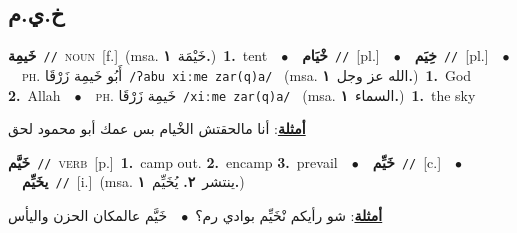 \documentclass[10pt,a4paper,twoside]{article} %
\begin{document}
\begin{multicols}{2}
\vspace{-3mm}
\subsection*{\color{blue}\foreignlanguage{arabic}{خ.ي.م}\color{blue}{}} 

{\setlength\topsep{0pt}\textbf{\foreignlanguage{arabic}{خَيمِة}}\ {\color{gray}\texttt{//}\color{black}}\ \textsc{noun}\ [f.]\ \color{gray}(msa. \foreignlanguage{arabic}{خَيْمَة}~\foreignlanguage{arabic}{\textbf{١.}})\color{black}\ \textbf{1.}~tent\ \ $\bullet$\ \ \setlength\topsep{0pt}\textbf{\foreignlanguage{arabic}{خْيَام}}\ {\color{gray}\texttt{//}\color{black}}\ [pl.]\ \ $\bullet$\ \ \setlength\topsep{0pt}\textbf{\foreignlanguage{arabic}{خِيَم}}\ {\color{gray}\texttt{//}\color{black}}\ [pl.]\ \ $\bullet$\ \ \textsc{ph.} \color{gray} \foreignlanguage{arabic}{أَبُو خَيمِة زَرْقَا}\color{black}\ {\color{gray}\texttt{/{\sffamily ʔabu xiːme zar(q)a}/}\color{black}}\ \color{gray} (msa. \foreignlanguage{arabic}{الله عز وجل}~\foreignlanguage{arabic}{\textbf{١.}})\color{black}\ \textbf{1.}~God  \textbf{2.}~Allah\ \ $\bullet$\ \ \textsc{ph.} \color{gray} \foreignlanguage{arabic}{خَيمِة زَرْقَا}\color{black}\ {\color{gray}\texttt{/{\sffamily xiːme zar(q)a}/}\color{black}}\ \color{gray} (msa. \foreignlanguage{arabic}{السماء}~\foreignlanguage{arabic}{\textbf{١.}})\color{black}\ \textbf{1.}~the sky\  \begin{flushright}\color{gray}\foreignlanguage{arabic}{\textbf{\underline{\foreignlanguage{arabic}{أمثلة}}}: أنا مالحقتش الخْيام بس عمك أبو محمود لحق}\end{flushright}\color{black}} \vspace{2mm}

{\setlength\topsep{0pt}\textbf{\foreignlanguage{arabic}{خَيَّم}}\ {\color{gray}\texttt{//}\color{black}}\ \textsc{verb}\ [p.]\ \textbf{1.}~camp out.  \textbf{2.}~encamp  \textbf{3.}~prevail\ \ $\bullet$\ \ \setlength\topsep{0pt}\textbf{\foreignlanguage{arabic}{خَيِّم}}\ {\color{gray}\texttt{//}\color{black}}\ [c.]\ \ $\bullet$\ \ \setlength\topsep{0pt}\textbf{\foreignlanguage{arabic}{يخَيِّم}}\ {\color{gray}\texttt{//}\color{black}}\ [i.]\ \color{gray}(msa. \foreignlanguage{arabic}{ينتشر}~\foreignlanguage{arabic}{\textbf{٢.}}  \foreignlanguage{arabic}{يُخَيِّم}~\foreignlanguage{arabic}{\textbf{١.}})\color{black}\  \begin{flushright}\color{gray}\foreignlanguage{arabic}{\textbf{\underline{\foreignlanguage{arabic}{أمثلة}}}: شو رأيكم نْخَيِّم بوادي رم؟\ $\bullet$\ \  خَيَّم عالمكان الحزن واليأس}\end{flushright}\color{black}} \vspace{2mm}


\end{multicols}
\end{document}
